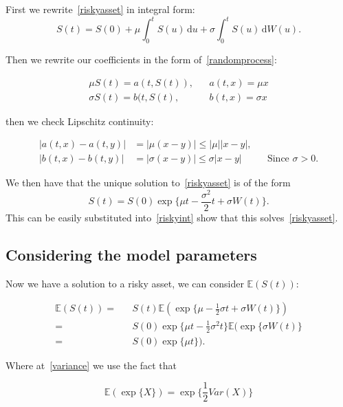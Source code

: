 \documentclass[11pt]{article} %
\begin{document}
First we rewrite~\eqref{riskyasset} in integral form:
\begin{equation}\label{riskyint}
    S(t) = S(0) + \mu\int_0^t \! S(u) \, \mathrm{d}u + \sigma\int_0^t \! S(u) \, 
    \mathrm{d}W(u).
\end{equation}

Then we rewrite our coefficients in the form of~\eqref{randomprocess}: 

\begin{align}
    \mu S(t) = a(t,S(t)), && a(t,x) = \mu x \\
    \sigma S(t) = b(t,S(t), && b(t,x) = \sigma x
\end{align}

then we check Lipschitz continuity:

\begin{align}
    |a(t,x) - a(t,y)| &= |\mu(x-y)| \leq |\mu||x-y|, \\
    |b(t,x) - b(t,y)| &= |\sigma(x-y)| \leq \sigma|x-y| &&\text{Since $\sigma > 0$.}
\end{align}

We then have that the unique solution to~\eqref{riskyasset} is of the form 
\begin{equation}
    S(t) = S(0)\exp\{\mu t - \frac{\sigma^2}{2}t + \sigma W(t)\}.
\end{equation}
This can be easily substituted into~\eqref{riskyint} show that this solves~\eqref{riskyasset}.

\subsection{Considering the model parameters}

Now we have a solution to a risky asset, we can consider $\mathbb{E}(S(t))$:

\begin{align}
    \mathbb{E}(S(t))  = &&S(t)\mathbb{E}(\exp\{\mu - \frac{1}{2}\sigma t + \sigma W(t)\})\\
     \label{variance}= 
     && S(0)\exp\{\mu t - \frac{1}{2}\sigma^2 t\}\mathbb{E}(\exp\{\sigma W(t)\} \\
    \label{result} = && S(0)\exp\{\mu t\}).
\end{align}

Where at~\eqref{variance} we use the fact that 

\begin{equation*}
    \mathbb{E}(\exp\{X\}) = \exp\{\frac{1}{2}Var(X)\}
\end{equation*}
\end{document}
